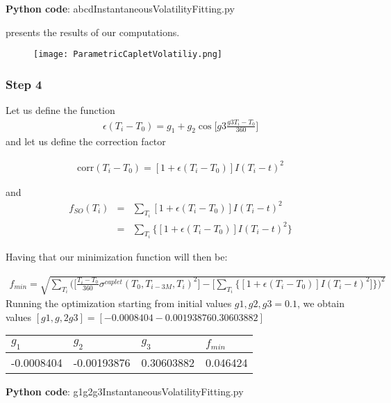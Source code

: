\documentclass[11pt]{article}
\numberwithin{equation}{subsection}
\begin{document}
\textbf{Python code}: abcdInstantaneousVolatilityFitting.py

presents the results of our computations.

\begin{figure}[H]
	\texttt{[image: ParametricCapletVolatiliy.png]}
\end{figure}

\subsubsection*{Step 4}
Let us define the function
\begin{eqnarray*}
	\epsilon(T_i-T_0) = g_1 + g_2 \cos\bigg[g3\frac{g3 T_i-T_0}{360} \bigg]
\end{eqnarray*}
and let us define the correction factor 

\begin{eqnarray*}
	\text{corr}(T_i-T_0) = [1 + \epsilon(T_i-T_0)] I(T_i-t)^2
\end{eqnarray*}

and 
\begin{eqnarray*}
	f_{SO}(T_i) &=& \sum_{T_i} [1 + \epsilon(T_i-T_0)] I(T_i-t)^2 \\ 
	&=& \sum_{T_i} \big\{ [1 + \epsilon(T_i-T_0)] I(T_i-t)^2 \big\} 
\end{eqnarray*}

Having that our minimization function will then be:

\begin{eqnarray*}
	f_{min} = \sqrt{\sum_{T_i}\bigg(\bigg[\frac{T_i-T_0}{360} \sigma^{caplet}(T_0, T_{i-3M}, T_i)^2 \bigg] - \bigg[\sum_{T_i} \big\{ [1 + \epsilon(T_i-T_0)] I(T_i-t)^2 \bigg] \big\}\bigg)^2}
\end{eqnarray*}
Running the optimization starting from initial values \(g1, g2, g3 = 0.1\), we obtain values \([g1, g, 2g3] = [-0.0008404  -0.00193876  0.30603882]\)


\vskip 0.2cm 		
{
	\begin{center}
		\begin{tabular}{llll}
			\hline
			\(g_1\)   & \(g_2\)  & \(g_3\)  & \(f_{min}\) \\
			\hline
			-0.0008404  & -0.00193876  & 0.30603882 & 0.046424\\			
			\hline				 				
		\end{tabular}
	\end{center}
}
\vskip 0.4cm


\textbf{Python code}: g1g2g3InstantaneousVolatilityFitting.py
\end{document}

